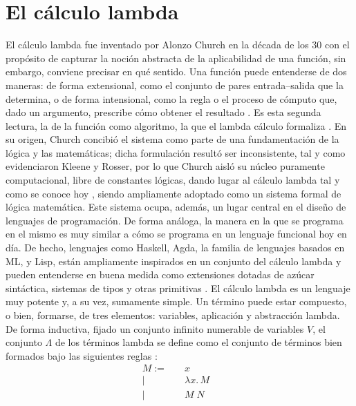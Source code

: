 \section{El cálculo lambda}
El cálculo lambda fue inventado por Alonzo Church en la década de los 30 con el propósito de capturar la noción abstracta de la aplicabilidad de una función, sin embargo, conviene precisar en qué sentido. Una función puede entenderse de dos maneras: de forma extensional, como el conjunto de pares entrada–salida que la determina, o de forma intensional, como la regla o el proceso de cómputo que, dado un argumento, prescribe cómo obtener el resultado \citep{geuvers2014}. Es esta segunda lectura, la de la función como algoritmo, la que el lambda cálculo formaliza \citep{barendregt1984, geuvers2014}. En su origen, Church concibió el sistema como parte de una fundamentación de la lógica y las matemáticas; dicha formulación resultó ser inconsistente, tal y como evidenciaron Kleene y Rosser, por lo que Church aisló su núcleo puramente computacional, libre de constantes lógicas, dando lugar al cálculo lambda tal y como se conoce hoy \citep{barendregt1984}, siendo ampliamente adoptado como un sistema formal de lógica matemática.
\newline
\newline
Este sistema ocupa, además, un lugar central en el diseño de lenguajes de programación. De forma análoga, la manera en la que se programa en el mismo es muy similar a cómo se programa en un lenguaje funcional hoy en día. De hecho, lenguajes como Haskell, Agda, la familia de lenguajes basados en ML, y Lisp, están ampliamente inspirados en un conjunto del cálculo lambda y pueden entenderse en buena medida como extensiones dotadas de azúcar sintáctica, sistemas de tipos y otras primitivas \citep{pierce2002}.
\newline
\newline
El cálculo lambda es un lenguaje muy potente y, a su vez, sumamente simple. Un término puede estar compuesto, o bien, formarse, de tres elementos: variables, aplicación y abstracción lambda. De forma inductiva, fijado un conjunto infinito numerable de variables $V$, el conjunto $\Lambda$ de los términos lambda se define como el conjunto de términos bien formados bajo las siguientes reglas \citep{geuvers2014, pierce2002}:
\begin{align}
  M := \quad & x & \tag{1}\\
  \mid \quad & \lambda x.\, M & \tag{2}\\
  \mid \quad & M \; N \tag{3}&
\end{align}

